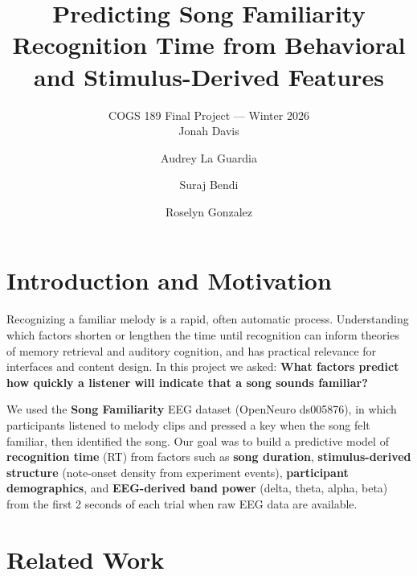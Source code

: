 \documentclass[11pt,a4paper]{article}
\title{\textbf{Predicting Song Familiarity Recognition Time from Behavioral and Stimulus-Derived Features}}
\author{COGS 189 Final Project --- Winter 2026\\[0.5em]
Jonah Davis \and Audrey La Guardia \and Suraj Bendi \and Roselyn Gonzalez}
\date{}
\begin{document}
\maketitle

\section{Introduction and Motivation}

Recognizing a familiar melody is a rapid, often automatic process. Understanding which factors shorten or lengthen the time until recognition can inform theories of memory retrieval and auditory cognition, and has practical relevance for interfaces and content design. In this project we asked: \textbf{What factors predict how quickly a listener will indicate that a song sounds familiar?}

We used the \textbf{Song Familiarity} EEG dataset (OpenNeuro ds005876), in which participants listened to melody clips and pressed a key when the song felt familiar, then identified the song. Our goal was to build a predictive model of \textbf{recognition time} (RT) from factors such as \textbf{song duration}, \textbf{stimulus-derived structure} (note-onset density from experiment events), \textbf{participant demographics}, and \textbf{EEG-derived band power} (delta, theta, alpha, beta) from the first 2 seconds of each trial when raw EEG data are available.

\section{Related Work}
\end{document}
